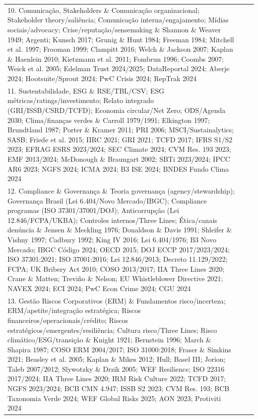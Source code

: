 \begin{longtable}{p{2.5cm}p{5.5cm}p{5.5cm}}
10. Comunicação, Stakeholders \&
Comunicação organizacional; Stakeholder theory/saliência; Comunicação interna/engajamento; Mídias sociais/advocacy; Crise/reputação/sensemaking \&
Shannon \& Weaver 1949; Argenti; Kunsch 2017; Grunig \& Hunt 1984; Freeman 1984; Mitchell et al. 1997; Frooman 1999; Clampitt 2016; Welch \& Jackson 2007; Kaplan \& Haenlein 2010; Kietzmann et al. 2011; Fombrun 1996; Coombs 2007; Weick et al. 2005; Edelman Trust 2024/2025; DataReportal 2024; Aberje 2024; Hootsuite/Sprout 2024; PwC Crisis 2024; RepTrak 2024 \\

11. Sustentabilidade, ESG \&
RSE/TBL/CSV; ESG métricas/ratings/investimento; Relato integrado (GRI/ISSB/CSRD/TCFD); Economia circular/Net Zero; ODS/Agenda 2030; Clima/finanças verdes \&
Carroll 1979/1991; Elkington 1997; Brundtland 1987; Porter \& Kramer 2011; PRI 2006; MSCI/Sustainalytics; SASB; Friede et al. 2015; IIRC 2021; GRI 2021; TCFD 2017; IFRS S1/S2 2023; EFRAG ESRS 2023/2024; SEC Climate 2024; CVM Res. 193 2023; EMF 2013/2024; McDonough \& Braungart 2002; SBTi 2023/2024; IPCC AR6 2023; NGFS 2024; ICMA 2024; B3 ISE 2024; BNDES Fundo Clima 2024 \\

12. Compliance \& Governança \&
Teoria governança (agency/stewardship); Governança Brasil (Lei 6.404/Novo Mercado/IBGC); Compliance programas (ISO 37301/37001/DOJ); Anticorrupção (Lei 12.846/FCPA/UKBA); Controles internos/Three Lines; Ética/canais denúncia \&
Jensen \& Meckling 1976; Donaldson \& Davis 1991; Shleifer \& Vishny 1997; Cadbury 1992; King IV 2016; Lei 6.404/1976; B3 Novo Mercado; IBGC Código 2024; OECD 2015; DOJ ECCP 2017/2023/2024; ISO 37301:2021; ISO 37001:2016; Lei 12.846/2013; Decreto 11.129/2022; FCPA; UK Bribery Act 2010; COSO 2013/2017; IIA Three Lines 2020; Crane \& Matten; Treviño \& Nelson; EU Whistleblower Directive 2021; NAVEX 2024; ECI 2024; PwC Econ Crime 2024; CGU 2024 \\

13. Gestão Riscos Corporativos (ERM) \&
Fundamentos risco/incerteza; ERM/apetite/integração estratégica; Riscos financeiros/operacionais/crédito; Riscos estratégicos/emergentes/resiliência; Cultura risco/Three Lines; Risco climático/ESG/transição \&
Knight 1921; Bernstein 1996; March \& Shapira 1987; COSO ERM 2004/2017; ISO 31000:2018; Fraser \& Simkins 2021; Beasley et al. 2005; Kaplan \& Mikes 2012; Hull; Basel III; Jorion; Taleb 2007/2012; Slywotzky \& Drzik 2005; WEF Resilience; ISO 22316 2017/2024; IIA Three Lines 2020; IRM Risk Culture 2022; TCFD 2017; NGFS 2023/2024; BCB CMN 4.947; ISSB S2 2023; CVM Res. 193; BCB Taxonomia Verde 2024; WEF Global Risks 2025; AON 2023; Protiviti 2024 \\


\end{longtable}
